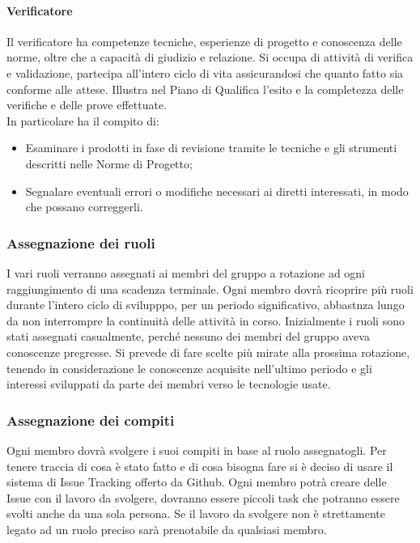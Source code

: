 \documentclass[../norme_di_progetto.tex]{subfiles}
\begin{document}
        \paragraph{Verificatore}
        Il verificatore ha competenze tecniche, esperienze di progetto e conoscenza delle norme, oltre che a capacità di giudizio e relazione. Si occupa di attività di verifica e validazione, partecipa all'intero ciclo di vita assicurandosi che quanto fatto sia conforme alle attese. Illustra nel Piano di Qualifica l'esito e la completezza delle verifiche e delle prove effettuate.\\
        In particolare ha il compito di:
        \begin{itemize}
            \item Esaminare i prodotti in fase di revisione tramite le tecniche e gli strumenti descritti nelle Norme di Progetto;
            \item Segnalare eventuali errori o modifiche necessari ai diretti interessati, in modo che possano correggerli.
        \end{itemize}

    \subsubsection{Assegnazione dei ruoli}
    I vari ruoli verranno assegnati ai membri del gruppo a rotazione ad ogni raggiungimento di una scadenza terminale. Ogni membro dovrà ricoprire più ruoli durante l'intero ciclo di svilupppo, per un periodo significativo, abbastnza lungo da non interrompre la continuità delle attività in corso.
    Inizialmente i ruoli sono stati assegnati casualmente, perché nessuno dei membri del gruppo aveva conoscenze pregresse. Si prevede di fare scelte più mirate alla prossima rotazione, tenendo in considerazione le conoscenze acquisite nell'ultimo periodo e gli interessi sviluppati da parte dei membri verso le tecnologie usate.
    \subsubsection{Assegnazione dei compiti}
    Ogni membro dovrà svolgere i suoi compiti in base al ruolo assegnatogli. Per tenere traccia di cosa è stato fatto e di cosa bisogna fare si è deciso di usare il sistema di Issue Tracking offerto da Github. Ogni membro potrà creare delle Issue con il lavoro da svolgere, dovranno essere piccoli task che potranno essere svolti anche da una sola persona. Se il lavoro da svolgere non è strettamente legato ad un ruolo preciso sarà prenotabile da qualsiasi membro.
\end{document}
